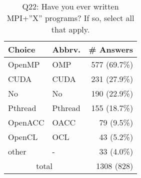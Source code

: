 \begin{table}[htb]%
\begin{center}%
\caption{Q22: Have you ever written MPI+”X” programs? If so, select all that apply.}%
\label{tab:Q22-ans}%
\begin{tabular}{l|l|r}%
\hline%
Choice & Abbrv. & \# Answers \\%
\hline%
OpenMP & OMP & 577 (69.7\%) \\%
CUDA & CUDA & 231 (27.9\%) \\%
No & No & 190 (22.9\%) \\%
Pthread & Pthread & 155 (18.7\%) \\%
OpenACC & OACC & 79 (9.5\%) \\%
OpenCL & OCL & 43 (5.2\%) \\%
other & - & 33 (4.0\%) \\%
\hline%
\multicolumn{2}{c}{total} & 1308 (828)\\%
\hline%
\end{tabular}%
\end{center}%
\end{table}%
